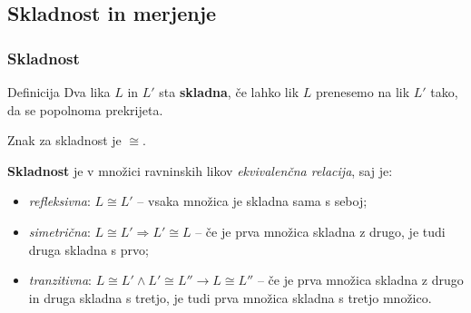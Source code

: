     \subsection{Skladnost in merjenje}

        \begin{frame}
            \frametitle{Skladnost}

            \begin{alertblock}{Definicija}
                Dva lika $L$ in $L'$ sta \textbf{skladna}, če lahko lik $L$ prenesemo na lik $L'$ tako,
                da se popolnoma prekrijeta.

                Znak za skladnost je $\cong$.
            \end{alertblock}

            \begin{block}{}
                \textbf{Skladnost} je v množici ravninskih likov \textit{ekvivalenčna relacija}, saj je:
                \begin{itemize}
                    \item \textit{refleksivna}: $L\cong L'$ -- vsaka množica je skladna sama s seboj;
                    \item \textit{simetrična}: $L\cong L' \Rightarrow L'\cong L$ -- če je prva množica skladna z drugo, je tudi druga skladna s prvo;
                    \item \textit{tranzitivna}: $L\cong L' \land L'\cong L'' \rightarrow L\cong L''$ -- če je prva množica skladna z drugo in druga skladna s tretjo, 
                            je tudi prva množica skladna s tretjo množico.
                \end{itemize}
            \end{block}
        \end{frame}


